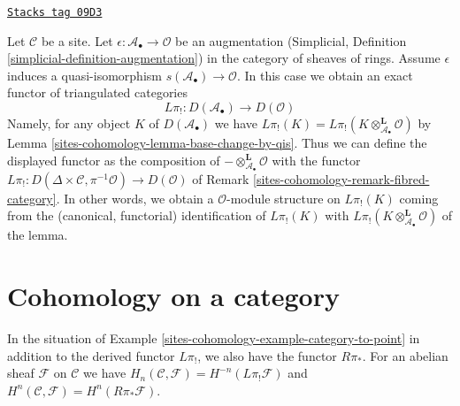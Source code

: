 \begin{remark}
\label{sites-cohomology-remark-homology-augmentation}
\href{https://stacks.math.columbia.edu/tag/09D3}{\texttt{Stacks tag 09D3}}

Let $\mathcal{C}$ be a site. Let
$\epsilon : \mathcal{A}_\bullet \to \mathcal{O}$ be an augmentation
(Simplicial, Definition \ref{simplicial-definition-augmentation})
in the category of sheaves of rings.
Assume $\epsilon$ induces a quasi-isomorphism
$s(\mathcal{A}_\bullet) \to \mathcal{O}$.
In this case we obtain an exact functor of triangulated categories
$$
L\pi_! : D(\mathcal{A}_\bullet) \longrightarrow D(\mathcal{O})
$$
Namely, for any object $K$ of $D(\mathcal{A}_\bullet)$ we have
$L\pi_!(K) = L\pi_!(K \otimes_{\mathcal{A}_\bullet}^\mathbf{L} \mathcal{O})$
by Lemma \ref{sites-cohomology-lemma-base-change-by-qis}.
Thus we can define the displayed functor as the composition of
$- \otimes^\mathbf{L}_{\mathcal{A}_\bullet} \mathcal{O}$ with the functor
$L\pi_! : D(\Delta \times \mathcal{C}, \pi^{-1}\mathcal{O}) \to
D(\mathcal{O})$ of Remark \ref{sites-cohomology-remark-fibred-category}.
In other words, we obtain a $\mathcal{O}$-module structure on $L\pi_!(K)$
coming from the (canonical, functorial) identification of $L\pi_!(K)$ with
$L\pi_!(K \otimes_{\mathcal{A}_\bullet}^\mathbf{L} \mathcal{O})$ of the lemma.
\end{remark}

\section{Cohomology on a category}
\label{sites-cohomology-section-cohomology}
In the situation of Example \ref{sites-cohomology-example-category-to-point}
in addition to the derived functor $L\pi_!$, we also have the functor
$R\pi_*$. For an abelian sheaf $\mathcal{F}$ on $\mathcal{C}$
we have $H_n(\mathcal{C}, \mathcal{F}) = H^{-n}(L\pi_!\mathcal{F})$
and $H^n(\mathcal{C}, \mathcal{F}) = H^n(R\pi_*\mathcal{F})$.

